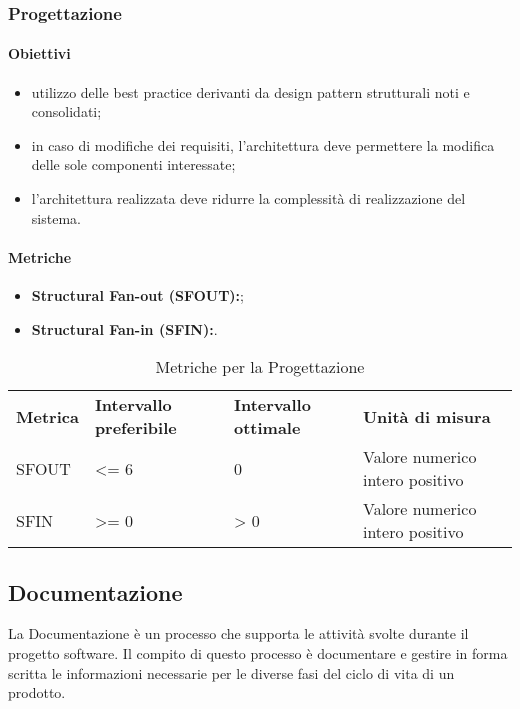 \subsubsection{Progettazione}
\paragraph{Obiettivi}
\begin{itemize}
	\item utilizzo delle best practice derivanti da design pattern strutturali noti e consolidati;
	\item in caso di modifiche dei requisiti, l'architettura deve permettere la modifica delle sole componenti interessate;
	\item l'architettura realizzata deve ridurre la complessità di realizzazione del sistema.
\end{itemize}

\paragraph{Metriche}
\begin{itemize}
	\item \textbf{Structural Fan-out (SFOUT):};
	\item \textbf{Structural Fan-in (SFIN):}.
\end{itemize}

\renewcommand{\arraystretch}{2.2}
\begin{longtable}{|C{4.5cm}|C{2.25cm}|C{2.25cm}|C{3cm}|}

	\caption{Metriche per la Progettazione}\\
	\hline

	\textbf{Metrica} & \textbf{Intervallo preferibile}  & \textbf{Intervallo ottimale} & \textbf{Unità di misura}
	\tabularnewline
	\endfirsthead

	SFOUT & <= 6  & 0 & Valore numerico intero positivo \\
	SFIN &  >= 0 & > 0 & Valore numerico intero positivo \\
\end{longtable}




\subsection{Documentazione}
La Documentazione è un processo che supporta le attività svolte durante
il progetto software.
Il compito di questo processo è documentare e
gestire in forma scritta le informazioni necessarie per le diverse fasi del
ciclo di vita di un prodotto.
